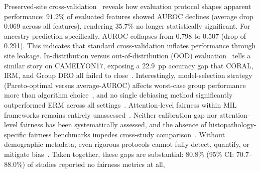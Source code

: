 Preserved-site cross-validation~\citep{howard2021site} reveals how evaluation protocol shapes apparent performance: $91.2$\%
of evaluated features showed AUROC declines (average drop 0.069 across all features),
rendering $35.7$\% no longer statistically significant. For ancestry prediction specifically, AUROC collapses from 0.798 to 0.507 (drop of 0.291). This indicates that
standard cross-validation inflates performance through site leakage. In-distribution
versus out-of-distribution (OOD) evaluation~\citep{koh2021wilds} tells a similar story on CAMELYON17, exposing a 22.9~pp accuracy
gap that CORAL, IRM, and Group DRO all failed to close~\citep{koh2021wilds}. Interestingly, model-selection strategy (Pareto-optimal
versus average-AUROC) affects worst-case group performance more than
algorithm choice~\citep{zong2023medfair}, and no single debiasing method
significantly outperformed ERM across all settings~\citep{zong2023medfair}.
Attention-level fairness within MIL frameworks remains entirely
unassessed~\citep{ling2024agent, campanella2019clinical}. Neither calibration gap nor attention-level fairness has been systematically assessed, and the
absence of histopathology-specific fairness benchmarks impedes
cross-study comparison~\citep{montezuma2025unbiased, chen2023algorithmic}.
Without demographic metadata, even rigorous protocols cannot fully
detect, quantify, or mitigate bias~\citep{norori2021addressing}.
Taken together, these gaps are substantial: 80.8\% (95\% CI: 70.7--88.0\%) of studies reported no fairness metrics at all,

